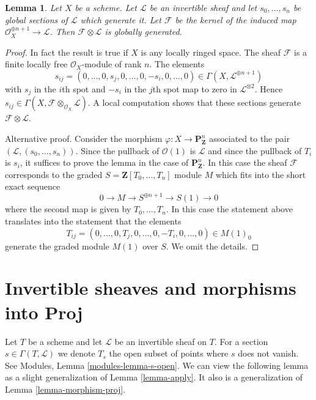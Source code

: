 \documentclass{stacks-project}
\theoremstyle{plain}
\newtheorem{lemma}[subsection]{Lemma}
\theoremstyle{definition}
\theoremstyle{remark}
\numberwithin{equation}{subsection}
\begin{document}
\begin{lemma}
\label{lemma-globally-generated-omega-twist-1}
Let $X$ be a scheme. Let $\mathcal{L}$ be an invertible sheaf
and let $s_0, \ldots, s_n$ be global sections of $\mathcal{L}$
which generate it. Let $\mathcal{F}$ be the kernel of the induced
map $\mathcal{O}_X^{\oplus n + 1} \to \mathcal{L}$.
Then $\mathcal{F} \otimes \mathcal{L}$ is globally generated.
\end{lemma}

\begin{proof}
In fact the result is true if $X$ is any locally ringed space.
The sheaf $\mathcal{F}$ is a finite locally free $\mathcal{O}_X$-module
of rank $n$. The elements
$$
s_{ij} = (0, \ldots, 0, s_j, 0, \ldots, 0, -s_i, 0, \ldots, 0)
\in \Gamma(X, \mathcal{L}^{\oplus n + 1})
$$
with $s_j$ in the $i$th spot and $-s_i$ in the $j$th spot map to zero
in $\mathcal{L}^{\otimes 2}$. Hence
$s_{ij} \in \Gamma(X, \mathcal{F} \otimes_{\mathcal{O}_X} \mathcal{L})$.
A local computation shows that these sections generate
$\mathcal{F} \otimes \mathcal{L}$.

\medskip\noindent
Alternative proof. Consider the morphism
$\varphi : X \to \mathbf{P}^n_\mathbf{Z}$ associated to
the pair $(\mathcal{L}, (s_0, \ldots, s_n))$. Since the pullback
of $\mathcal{O}(1)$ is $\mathcal{L}$ and since the pullback
of $T_i$ is $s_i$, it suffices to prove the lemma in the
case of $\mathbf{P}^n_\mathbf{Z}$. In this case the sheaf
$\mathcal{F}$ corresponds to the graded $S = \mathbf{Z}[T_0, \ldots, T_n]$
module $M$ which fits into the short exact sequence
$$
0 \to M \to S^{\oplus n + 1} \to S(1) \to 0
$$
where the second map is given by $T_0, \ldots, T_n$. In this
case the statement above translates into the statement that
the elements
$$
T_{ij} = (0, \ldots, 0, T_j, 0, \ldots, 0, -T_i, 0, \ldots, 0)
\in M(1)_0
$$
generate the graded module $M(1)$ over $S$. We omit the details.
\end{proof}








\section{Invertible sheaves and morphisms into Proj}
\label{section-invertible-proj}

\noindent
Let $T$ be a scheme and let $\mathcal{L}$ be an invertible sheaf
on $T$. For a section $s \in \Gamma(T, \mathcal{L})$ we denote
$T_s$ the open subset of points where $s$ does not vanish. See
Modules, Lemma \ref{modules-lemma-s-open}. We can view the following
lemma as a slight generalization of Lemma \ref{lemma-apply}.
It also is a generalization of Lemma \ref{lemma-morphism-proj}.
\end{document}
